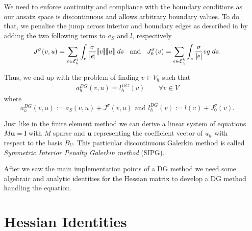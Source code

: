 We need to enforce continuity and compliance with the boundary conditions as our ansatz space is discontinuous and allows arbitrary boundary values. To do that, we penalise the jump across interior and boundary edges as described in  \cite[3.2.2.]{PPO+2000} by adding the two following terms to $a_S$ and $l$, respectively
\begin{align}
	J^\sigma(v, u) = \sum\limits_{e \in \mathcal{E}_h^i} \int_{e} {{ \frac \sigma {|e|} \llbracket v \rrbracket \llbracket u \rrbracket}\;ds}
		 \;\; \textnormal{ and } \;	\;
		 J^\sigma_0(v) = \sum\limits_{e \in \mathcal{E}_h^b} \int_{e} {{\frac \sigma {|e|} v g}\;ds} . \label{eq: penalty term}
\end{align}

Thus, we end up with the problem of finding $v \in V_h$ such that
\begin{align}
	a_h^{DG}(v, u) = l^{DG}_h (v) \qquad \forall v \in V \label{eq: DG system}
\end{align}
where
\[ 	
	a_h^{DG} (v, u) := a_S(v,u) + J^\sigma(v,u) \text{ and } l_h^{DG}(v) := l(v) + J^\sigma_0(v).
\]


Just like in the finite element method we can derive a linear system of equations $M \mathbf{u} = \mathbf{l}$ with $M$ sparse and $\mathbf{u}$ representing the coefficient vector of $u_h$ with respect to the basis $B_V$.
This particular discontinuous Galerkin method is called \emph{Symmetric Interior Penalty Galerkin method} (SIPG).





After we saw the main implementation points of a DG method we need some algebraic and analytic identities for the Hessian matrix to develop a DG method handling the \MA equation.
\section{Hessian Identities}

